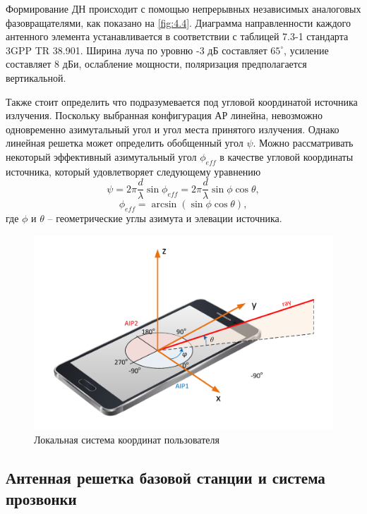 Формирование ДН происходит с помощью непрерывных независимых аналоговых фазовращателями, как показано
на \ref{fig:4.4}.  Диаграмма направленности каждого антенного элемента устанавливается в
соответствии с таблицей 7.3-1 стандарта 3GPP TR 38.901. Ширина луча по уровню -3
дБ составляет $65^\circ$, усиление составляет 8 дБи, ослабление мощности, поляризация предполагается вертикальной.





Также стоит определить что подразумевается под угловой координатой источника
излучения.  Поскольку выбранная конфигурация АР линейна, невозможно одновременно
азимутальный угол и угол места принятого излучения.  Однако линейная решетка
может определить обобщенный угол $\psi$. Можно рассматривать некоторый
эффективный азимутальный угол $\phi_{eff}$ в качестве угловой координаты
источника, который удовлетворяет следующему уравнению
\begin{equation}
    \label{eq:4.1}
    \psi = 2\pi \frac{d}{\lambda} \sin \phi_{eff} = 2\pi \frac{d}{\lambda} \sin\phi \cos{\theta},
\end{equation}
\begin{equation}
    \label{eq:4.2}
    \phi_{eff} = \arcsin(\sin \phi \cos \theta),
\end{equation}
где $\phi$ и $\theta$ -- геометрические углы азимута и элевации источника.

\begin{figure}[ht]
    \centering
    \includegraphics[width=0.75\linewidth]{figs/fig4.5}
    \caption{Локальная система координат пользователя}
    \label{fig:4.5}
\end{figure}

\subsection{Антенная решетка базовой станции и система прозвонки}

